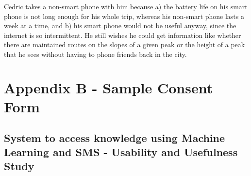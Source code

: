 \documentclass{article}
\begin{document}
Cedric takes a non-smart phone with him because a) the battery life on his smart phone is not long enough for his whole trip, whereas his non-smart phone lasts a week at a time, and b) his smart phone would not be useful anyway, since the internet is so intermittent.  He still wishes he could get information like whether there are maintained routes on the slopes of a given peak or the height of a peak that he sees without having to phone friends back in the city.
\newpage

\section*{Appendix B - Sample Consent Form}
\label{sec:appendixConsentForm}
\newpage

\subsection*{System to access knowledge using Machine Learning and SMS - Usability and Usefulness Study}
\end{document}
